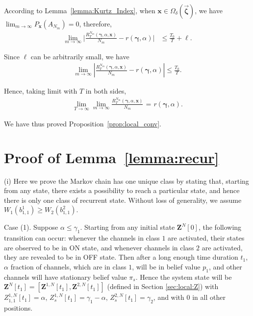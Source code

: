 \documentclass[11pt,twocolumn]{IEEEtran}
\begin{document}
According to Lemma~\ref{lemma:Kurtz_Index}, when $\bm x \in \Omega_{\delta}(\vec{\bm \zeta})$, we have $\lim_{m \rightarrow \infty} P_{\bm x}(A_{N_m})=0$, therefore,
\begin{align}
\lim_{m \rightarrow \infty} \Big| \frac{R_{T}^{{N_m}}(\bm \gamma, \alpha, \bm x)}{{N_m}}-r(\bm \gamma, \alpha)\Big|& \leq  \frac{T_0}{T} + \ell. \nonumber
\end{align}

Since $\ell$ can be arbitrarily small, we have
\begin{align}
\lim_{m \rightarrow \infty}  | \frac{R_{T}^{{N_m}}(\bm \gamma, \alpha, \bm x)}{{N_m}}-r(\bm \gamma, \alpha)|\leq \frac{T_0}{T}. \nonumber
\end{align}

Hence, taking limit with $T$ in both sides,
\begin{align}
\lim_{T \rightarrow \infty} \lim_{m \rightarrow \infty}  \frac{R_{T}^{N_m}(\bm \gamma, \alpha, \bm x)}{N_m}\hspace{1pt}{=}\hspace{1pt}r(\bm \gamma, \alpha) \nonumber.
\end{align}

We have thus proved Proposition~\ref{prop:local_conv}.

\section{Proof of Lemma~\ref{lemma:recur}}
\label{appen:recur}

(i) Here we prove the Markov chain has one unique class by stating that, starting from any state, there exists a possibility to reach a particular state, and hence there is only one class of recurrent state. Without loss of generality, we assume $W_1(b^1_{1,1})\geq W_2(b^2_{1,1})$.

Case (1). Suppose $\alpha\leq \gamma_1$.  Starting from any initial state $\bm Z^N[0]$, the following transition can occur: whenever the channels in class $1$ are activated, their states are observed to be in ON state, and whenever channels in class $2$ are activated, they are revealed to be in OFF state. Then after a long enough time duration $t_1$, $\alpha$ fraction of channels, which are in class $1$, will be in belief value $p_1$, and other channels will have stationary belief value $\pi_s$. Hence the system state will be $\bm Z^N[t_1]=[\bm Z^{1,N}[t_1], \bm Z^{2,N}[t_1]]$ (defined in Section \ref{sec:local:Z}) with $Z^{1,N}_{1,1}[t_1]=\alpha$, $Z^{1,N}_{s}[t_1]=\gamma_1-\alpha$, $Z^{2,N}_{s}[t_1]=\gamma_2$, and with $0$ in all other positions.
\end{document}
